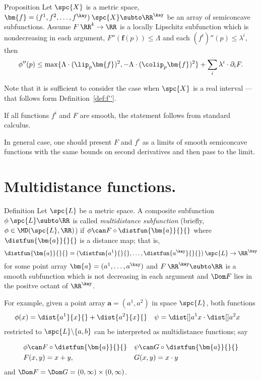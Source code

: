 \begin{thm}{Proposition}\label{prop:composite+convex}
Let $\spc{X}$ is a metric space,
$\bm{f}=(f^1,f^2,\dots,f^\kay)\:\spc{X}\subto\RR^\kay$
be an array of semiconcave subfunctions.
Assume $F\:\RR^k\to\RR$ is a locally Lipschitz subfunction which is nondecreasing in each argument,
$F''(\bm{f}(p))\le \Lambda$  
and each $(f^i)''(p)\le \lambda^i$, 
then
\[
\phi''(p)
\le
\max
\{\Lambda\cdot(\lip_p\bm{f})^2,-\Lambda\cdot(\colip_p\bm{f})^2\}
+\sum_i\lambda^i\cdot\partial_iF.
\]
\end{thm}

Note that it is sufficient to consider the case when $\spc{X}$ is a real interval 
--- that follows form Definition~\ref{def:f''}.

If all functions $f^i$ and $F$ are smooth,
the statement follows from standard calculus.

In general case, one should present $F$ and $f^i$ as a limits of smooth semiconcave functions with the same bounds on second derivatives and then pass to the limit.
\qeds

\section{Multidistance functions.}

\begin{thm}{Definition}\label{def:MD}
Let $\spc{L}$ be a metric space.
A composite  subfunction $\phi\:\spc{L}\subto\RR$ is called \emph{multidistance subfunction}%
(briefly, $\phi\in \MD(\spc{L},\RR)$) 
if
$\phi\can F\circ\distfun{\bm{a}}{}{}$ 
where $\distfun{\bm{a}}{}{}$ is a distance map; that is,
\[
\distfun{\bm{a}}{}{}
=
(\distfun{a^1}{}{},\dots,\distfun{a^\kay}{}{})\:\spc{L}\to\RR^\kay
\]
for some point array $\bm{a}=(a^1,\dots,a^\kay)$ and 
$F\:\RR^\kay\subto\RR$ is a smooth subfunction
which is not decreasing in each argument
and 
$\Dom F$
lies in the positve octant of $\RR^\kay$.
\end{thm}

For example, 
given a point array $\bm{a}=(a^1,a^2)$ in space $\spc{L}$,
both functions 
\begin{align*}
\phi(x)&=\dist{a^1}{x}{}+\dist{a^2}{x}{}
&
\psi&=\dist[{{}}]{a^1}{x}{}\cdot\dist[{{}}]{a^2}{x}{}
\end{align*}
 restricted to $\spc{L}\backslash \{a,b\}$ 
can be interpreted as multidistance functions;
say

\begin{align*}
&\phi\can F\circ\distfun{\bm{a}}{}{}
&
&\psi\can G\circ\distfun{\bm{a}}{}{}
\\
&F(x,y)=x+y, 
&
&G(x,y)=x\cdot y
\end{align*}
and $\Dom F=\Dom G=(0,\infty)\times(0,\infty)$.

